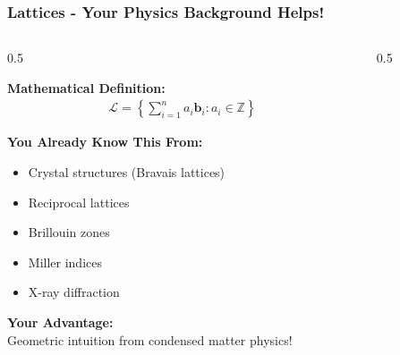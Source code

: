 \documentclass[aspectratio=169,10pt]{beamer}
\newcommand{\slideheader}[1]{\frametitle{#1}}
\theoremstyle{plain}
\begin{document}
\begin{frame}
  \slideheader{Lattices - Your Physics Background Helps!}
  
  \begin{columns}[T]
    \begin{column}{0.5\textwidth}

    \textbf{Mathematical Definition:}
    \begin{align}
      \mathcal{L} = \left\{ \sum_{i=1}^n a_i \mathbf{b}_i : a_i \in \mathbb{Z} \right\}
    \end{align}
    
    \vspace{0.3cm}
    
    \textbf{You Already Know This From:}
    \begin{itemize}
      \item Crystal structures (Bravais lattices)
      \item Reciprocal lattices
      \item Brillouin zones
      \item Miller indices
      \item X-ray diffraction
    \end{itemize}
    
    \vspace{0.3cm}
    
    \begin{greenBox}
      \textbf{Your Advantage:}\\
      Geometric intuition from condensed matter physics!
    \end{greenBox}
  
    \end{column}
    \begin{column}{0.5\textwidth}

\end{column}
\end{columns}
\end{frame}
\end{document}
